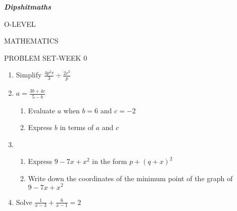 \documentclass{article}
\begin{document}
	

\textbf{\textit{Dipshitmaths}}

\begin{flushright}
	O-LEVEL 
	
	MATHEMATICS
	
	PROBLEM SET-WEEK 0
\end{flushright}

\begin{enumerate}
	\item  Simplify $\frac{4p^2r}{3}\div\frac{2r^3}{p}$
	
	\item $a=\frac{3b+4c}{5-b}$
		\begin{enumerate}
			\item Evaluate $a$ when $b=6$ and $c=-2$
			\item Express $b$ in terms of $a$ and $c$
		\end{enumerate}

	\item 
		\begin{enumerate}
			\item Express $9-7x+x^2$ in the form $p+(q+x)^2$
			\item Write down the coordinates of the minimum point of the graph of $9-7x+x^2$
		\end{enumerate}
	
	\item Solve $\frac{1}{x-3} + \frac{6}{x-1} = 2$
	
\end{enumerate}
\end{document}
